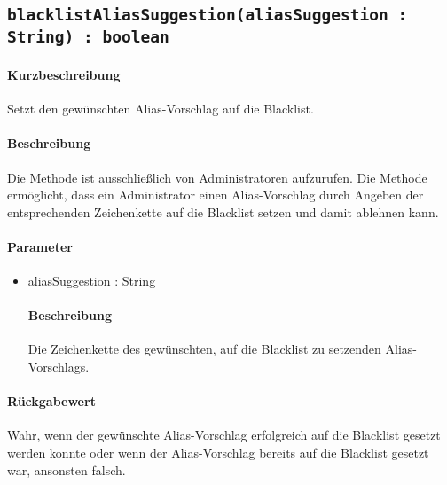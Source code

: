 \subsection{\texttt{blacklistAliasSuggestion(aliasSuggestion : String) : boolean}}%
\paragraph*{Kurzbeschreibung}
Setzt den gewünschten Alias-Vorschlag auf die Blacklist.
\paragraph*{Beschreibung}
Die Methode ist ausschließlich von Administratoren aufzurufen.
Die Methode ermöglicht, dass ein Administrator einen Alias-Vorschlag durch Angeben der entsprechenden Zeichenkette auf die Blacklist setzen und damit ablehnen kann.
\paragraph*{Parameter}
\begin{itemize}
	\item aliasSuggestion : String
		\paragraph*{Beschreibung}
		Die Zeichenkette des gewünschten, auf die Blacklist zu setzenden Alias-Vorschlags.
\end{itemize}
\paragraph*{Rückgabewert}
Wahr, wenn der gewünschte Alias-Vorschlag erfolgreich auf die Blacklist gesetzt werden konnte oder wenn der Alias-Vorschlag bereits auf die Blacklist gesetzt war, ansonsten falsch.
